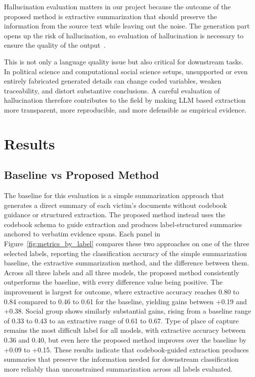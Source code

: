 \documentclass{article}
\begin{document}
Hallucination evaluation matters in our project because the outcome of the proposed method is extractive summarization that should preserve the information from the source text while leaving out the noise. The generation part opens up the risk of hallucination, so evaluation of hallucination is necessary to ensure the quality of the output~\cite{Zhang_etal2025}.

This is not only a language quality issue but also critical for downstream tasks. In political science and computational social science setups, unsupported or even entirely fabricated generated details can change coded variables, weaken traceability, and distort substantive conclusions. A careful evaluation of hallucination therefore contributes to the field by making LLM based extraction more transparent, more reproducible, and more defensible as empirical evidence.

\section{Results}\label{results}

\subsection{Baseline vs Proposed
Method}\label{baseline-vs-proposed-method}

The baseline for this evaluation is a simple summarization approach that generates a direct summary of each victim's documents without codebook guidance or structured extraction. The proposed method instead uses the codebook schema to guide extraction and produces label-structured summaries anchored to verbatim evidence spans. Each panel in Figure~\ref{fig:metrics_by_label} compares these two approaches on one of the three selected labels, reporting the classification accuracy of the simple summarization baseline, the extractive summarization method, and the difference between them. Across all three labels and all three models, the proposed method consistently outperforms the baseline, with every difference value being positive. The improvement is largest for outcome, where extractive accuracy reaches 0.80 to 0.84 compared to 0.46 to 0.61 for the baseline, yielding gains between +0.19 and +0.38. Social group shows similarly substantial gains, rising from a baseline range of 0.33 to 0.43 to an extractive range of 0.61 to 0.67. Type of place of capture remains the most difficult label for all models, with extractive accuracy between 0.36 and 0.40, but even here the proposed method improves over the baseline by +0.09 to +0.15. These results indicate that codebook-guided extraction produces summaries that preserve the information needed for downstream classification more reliably than unconstrained summarization across all labels evaluated.
\end{document}
